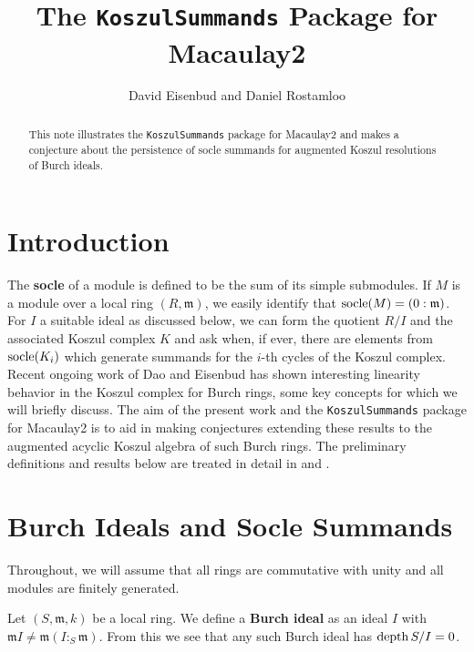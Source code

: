 \documentclass[twoside,12pt, leqno]{amsart}
\author{David Eisenbud and Daniel Rostamloo}
\title{The \texttt{KoszulSummands} Package for Macaulay2}
\begin{document}
\begin{abstract}
	This note illustrates the \texttt{KoszulSummands} package for Macaulay2 and makes a conjecture about the persistence of socle summands for augmented Koszul resolutions of Burch ideals.
\end{abstract}

\maketitle

\section*{Introduction}

The \textbf{socle} of a module is defined to be the sum of its simple submodules. If $M$ is a module over a local ring $(R, \mathfrak{m})$, we easily identify that $\operatorname{socle}(M) = (0 : \mathfrak{m})$. For $I$ a suitable ideal as discussed below, we can form the quotient $R / I$ and the associated Koszul complex $K$ and ask when, if ever, there are elements from $\operatorname{socle}(K_i)$ which generate summands for the $i$-th cycles of the Koszul complex. Recent ongoing work of Dao and Eisenbud has shown interesting linearity behavior in the Koszul complex for Burch rings, some key concepts for which we will briefly discuss. The aim of the present work and the \texttt{KoszulSummands} package for Macaulay2 is to aid in making conjectures extending these results to the augmented acyclic Koszul algebra of such Burch rings. The preliminary definitions and results below are treated in detail in \cite{DKT20} and \cite{DE23}. 

\section{Burch Ideals and Socle Summands}

Throughout, we will assume that all rings are commutative with unity and all modules are finitely generated.

\begin{definition}
Let $(S, \mathfrak{m}, k)$ be a local ring. We define a \textbf{Burch ideal} as an ideal $I$ with $\mathfrak{m} I \neq \mathfrak{m}(I :_S \mathfrak{m})$. From this we see that any such Burch ideal has $\operatorname{depth} S / I = 0$. 

\end{definition}
\end{document}
